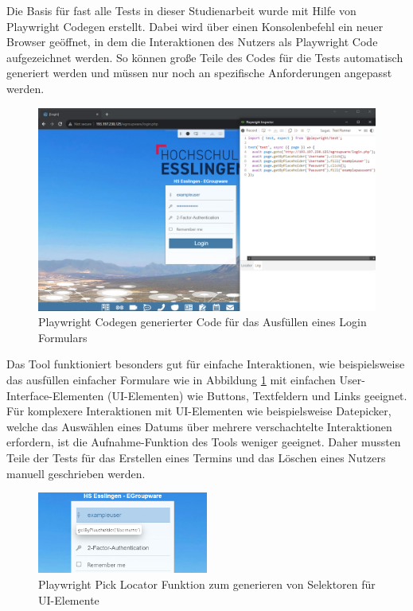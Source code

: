 Die Basis für fast alle Tests in dieser Studienarbeit wurde mit Hilfe von Playwright Codegen erstellt.
Dabei wird über einen Konsolenbefehl ein neuer Browser geöffnet, in dem die Interaktionen des Nutzers als Playwright Code aufgezeichnet werden.
So können große Teile des Codes für die Tests automatisch generiert werden und müssen nur noch an spezifische Anforderungen angepasst werden.
\begin{figure}[H]
    \centering
    \includegraphics[width=1\textwidth]{images/Playwright_Codegen.png}
    \caption{Playwright Codegen generierter Code für das Ausfüllen eines Login Formulars}
    \label{fig:playwright-codegen}
\end{figure}
Das Tool funktioniert besonders gut für einfache Interaktionen, wie beispielsweise das ausfüllen einfacher Formulare wie in Abbildung \ref{fig:playwright-codegen} mit einfachen User-Interface-Elementen (UI-Elementen) wie Buttons, Textfeldern und Links geeignet.
Für komplexere Interaktionen mit UI-Elementen wie beispielsweise Datepicker, welche das Auswählen eines Datums über mehrere verschachtelte Interaktionen erfordern, ist die Aufnahme-Funktion des Tools weniger geeignet.
Daher mussten Teile der Tests für das Erstellen eines Termins und das Löschen eines Nutzers manuell geschrieben werden.

\begin{figure}[H]
    \centering
    \includegraphics[width=0.5\textwidth]{images/Playwright_PickLocator.png}
    \caption{Playwright Pick Locator Funktion zum generieren von Selektoren für UI-Elemente}
    \label{fig:playwright-pick-locator}
\end{figure}

